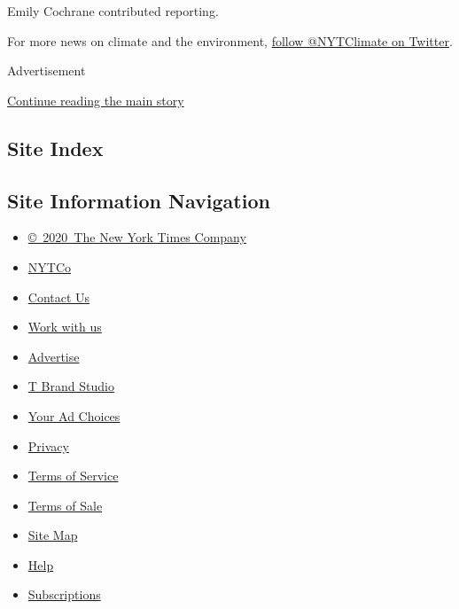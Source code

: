 Emily Cochrane contributed reporting.

For more news on climate and the environment,
\href{https://twitter.com/nytclimate}{follow @NYTClimate on Twitter}.

Advertisement

\protect\hyperlink{after-bottom}{Continue reading the main story}

\hypertarget{site-index}{%
\subsection{Site Index}\label{site-index}}

\hypertarget{site-information-navigation}{%
\subsection{Site Information
Navigation}\label{site-information-navigation}}

\begin{itemize}
\tightlist
\item
  \href{https://help.nytimes.com/hc/en-us/articles/115014792127-Copyright-notice}{©~2020~The
  New York Times Company}
\end{itemize}

\begin{itemize}
\tightlist
\item
  \href{https://www.nytco.com/}{NYTCo}
\item
  \href{https://help.nytimes.com/hc/en-us/articles/115015385887-Contact-Us}{Contact
  Us}
\item
  \href{https://www.nytco.com/careers/}{Work with us}
\item
  \href{https://nytmediakit.com/}{Advertise}
\item
  \href{http://www.tbrandstudio.com/}{T Brand Studio}
\item
  \href{https://www.nytimes.com/privacy/cookie-policy\#how-do-i-manage-trackers}{Your
  Ad Choices}
\item
  \href{https://www.nytimes.com/privacy}{Privacy}
\item
  \href{https://help.nytimes.com/hc/en-us/articles/115014893428-Terms-of-service}{Terms
  of Service}
\item
  \href{https://help.nytimes.com/hc/en-us/articles/115014893968-Terms-of-sale}{Terms
  of Sale}
\item
  \href{https://spiderbites.nytimes.com}{Site Map}
\item
  \href{https://help.nytimes.com/hc/en-us}{Help}
\item
  \href{https://www.nytimes.com/subscription?campaignId=37WXW}{Subscriptions}
\end{itemize}
